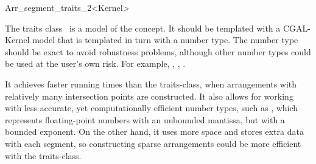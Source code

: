 \ccRefPageBegin
\begin{ccRefClass}{Arr_segment_traits_2<Kernel>}
    
\ccDefinition 
  The traits class \ccRefName\ is a model of the
   concept. It should be templated with a CGAL-Kernel
  model that is templated in turn with a number type. The number type should be
  exact to avoid robustness problems, although other number types could be used
  at the user's own risk. For example, ,
  , .

  It achieves faster running times than the
   traits-class, when arrangements
  with relatively many intersection points are constructed. It also allows for
  working with less accurate, yet computationally efficient number types, such
  as , which represents floating-point numbers with
  an unbounded mantissa, but with a bounded exponent. On the other hand, it
  uses more space and stores extra data with each segment, so constructing
  sparse arrangements could be more efficient with the
   traits-class.

 
\ccIsModel

\end{ccRefClass}
\ccRefPageEnd
